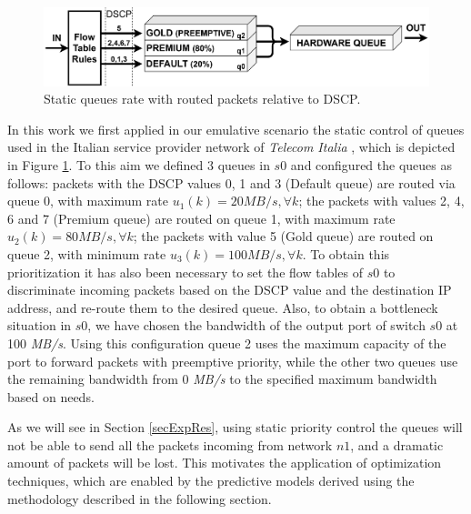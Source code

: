 \begin{figure}[tb!]
	\centering
	\includegraphics[keepaspectratio,width=\columnwidth]{figure/QUEUE.eps}
	\caption{Static queues rate with routed packets relative to DSCP.}
	\label{fig:{queue}}
\end{figure}

In this work we first applied in our emulative scenario the static control of queues used in the Italian service provider network of \textit{Telecom Italia} \cite{Notiziario}, which is depicted in Figure \ref{fig:{queue}}. To this aim we defined 3 queues in $s0$ and configured the queues as follows: packets with the DSCP values 0, 1 and 3 (Default queue) are routed via queue 0, with maximum rate $u_1(k) = 20 \textit{MB/s}, \forall k$; the packets with values 2, 4, 6 and 7 (Premium queue) are routed on queue 1, with maximum rate $u_2(k) = 80 \textit{MB/s}, \forall k$; the packets with value 5 (Gold queue) are routed on queue 2, with minimum rate $u_3(k) = 100 \textit{MB/s}, \forall k$. To obtain this prioritization it has also been necessary to set the flow tables of $s0$ to discriminate incoming packets based on the DSCP value and the destination IP address, and re-route them to the desired queue. Also, to obtain a bottleneck situation in $s0$, we have chosen the bandwidth of the output port of switch $s0$ at 100 \textit{MB/s}. Using this configuration queue 2 uses the maximum capacity of the port to forward packets with preemptive priority, while the other two queues use the remaining bandwidth from 0 \textit{MB/s} to the specified maximum bandwidth based on needs.

As we will see in Section \ref{secExpRes}, using static priority control the queues will not be able to send all the packets incoming from network $n1$, and a dramatic amount of packets will be lost. This motivates the application of optimization techniques, which are enabled by the predictive models derived using the methodology described in the following section.


